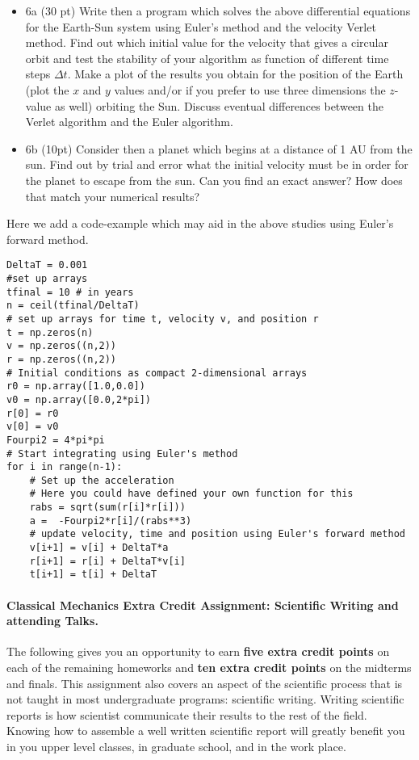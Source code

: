\documentclass[%
oneside,                 %
final,                   %
10pt]{article}
\begin{document}
\begin{itemize}
\item 6a (30 pt)  Write then a program which solves the above differential equations for the Earth-Sun system using Euler's  method and the velocity Verlet method.  Find out which initial value for the velocity that gives a circular orbit and test the stability of your algorithm as function of different time steps $\Delta t$.  Make a plot of the results you obtain for the position of the Earth (plot the $x$ and $y$ values and/or if you prefer to use three dimensions the $z$-value as well) orbiting  the Sun. Discuss eventual differences between the Verlet algorithm and the Euler algorithm. 

\item 6b (10pt) Consider then a planet which begins at a distance of 1 AU from the sun. Find out by trial and error what the initial velocity must be in order for the planet to escape from the sun.  Can you find an exact answer?  How does that match your numerical results?
\end{itemize}

\noindent
Here we add a code-example which may aid in the above studies using Euler's forward method.
\begin{verbatim}
DeltaT = 0.001
#set up arrays 
tfinal = 10 # in years
n = ceil(tfinal/DeltaT)
# set up arrays for time t, velocity v, and position r
t = np.zeros(n)
v = np.zeros((n,2))
r = np.zeros((n,2))
# Initial conditions as compact 2-dimensional arrays
r0 = np.array([1.0,0.0])
v0 = np.array([0.0,2*pi])
r[0] = r0
v[0] = v0
Fourpi2 = 4*pi*pi
# Start integrating using Euler's method
for i in range(n-1):
    # Set up the acceleration
    # Here you could have defined your own function for this
    rabs = sqrt(sum(r[i]*r[i]))
    a =  -Fourpi2*r[i]/(rabs**3)
    # update velocity, time and position using Euler's forward method
    v[i+1] = v[i] + DeltaT*a
    r[i+1] = r[i] + DeltaT*v[i]
    t[i+1] = t[i] + DeltaT
\end{verbatim}




\paragraph{Classical Mechanics Extra Credit Assignment: Scientific Writing and attending Talks.}
The following gives you an opportunity to earn \textbf{five extra credit
points} on each of the remaining homeworks and \textbf{ten extra credit points}
on the midterms and finals.  This assignment also covers an aspect of
the scientific process that is not taught in most undergraduate
programs: scientific writing.  Writing scientific reports is how
scientist communicate their results to the rest of the field.  Knowing
how to assemble a well written scientific report will greatly benefit
you in you upper level classes, in graduate school, and in the work
place.
\end{document}
